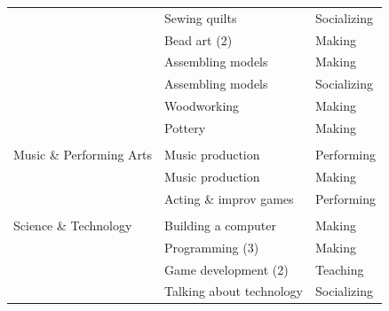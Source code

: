 \begin{table}[t!]
{\begin{tabular}{lll}
                         & Sewing quilts                                   & Socializing                                                               \\
                         & Bead art (2)                                    & Making                                                                    \\
                         & Assembling models                               & Making                                                                    \\
                         & Assembling models                               & Socializing                                                               \\
                         & Woodworking                                     & Making                                                                    \\
                         & Pottery                                         & Making                                                                    \\
                         &                                                 &                                                                           \\
Music \& Performing Arts & Music production                                & Performing                                                                \\
                         & Music production                                & Making                                                                    \\
                         & Acting \& improv games                          & Performing                                                                \\
                         &                                                 &                                                                           \\
Science \& Technology    & Building a computer                             & Making                                                                    \\
                         & Programming (3)                                 & Making                                                                    \\
                         & Game development (2)                            & Teaching                                                                  \\
                         & Talking about technology                        & Socializing                                                              
\end{tabular}
}
\end{table}

